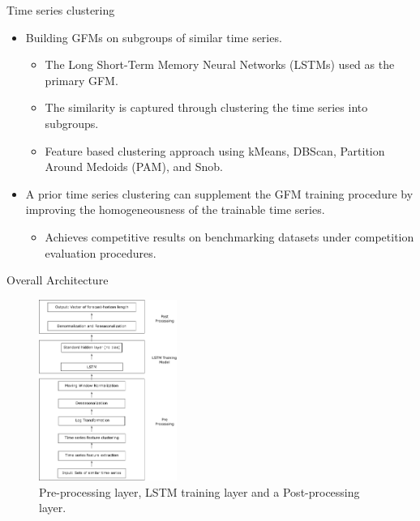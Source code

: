 \documentclass{beamer}
\begin{document}
\begin{frame}{Time series clustering}
	\begin{itemize}
	\item Building GFMs on subgroups of similar time series.
	\begin{itemize}\color{blue}
		\item The Long Short-Term Memory Neural Networks (LSTMs) used as the primary GFM.
		\item The similarity is captured through clustering the time series into subgroups.
		\item Feature based clustering approach using kMeans, DBScan, Partition Around Medoids (PAM),
and Snob.
	\end{itemize}
	\vspace{0.8mm}
	\item A prior time series clustering can supplement the GFM training procedure by improving the homogeneousness of the trainable time series.
	\begin{itemize}\color{blue}
		\item Achieves competitive results on benchmarking datasets under competition evaluation procedures.
	\end{itemize}
\end{itemize}
\end{frame} 

\begin{frame}{Overall Architecture}
 \begin{figure}[htb]
  \begin{center}
    \includegraphics[width=0.4\textwidth]{images/architecture_final2}
    \caption{Pre-processing layer, LSTM training layer and a Post-processing layer.}
  \label{fig:network}
  \end{center}
\end{figure}
\end{frame} 
\end{document}
